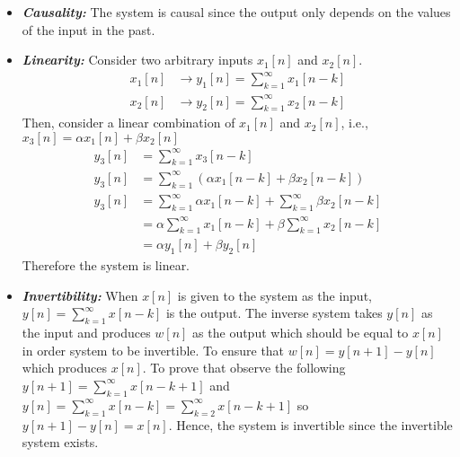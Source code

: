\documentclass[10pt,a4paper, margin=1in]{article}
\begin{document}
\begin{enumerate}
\begin{enumerate}
\begin{itemize}
		\item \textbf{\textit{Causality:}} The system is causal since the output only depends on the values of the input in the past.
		\item \textbf{\textit{Linearity:}} Consider two arbitrary inputs $x_1[n]$ and $x_2[n]$.
		\begin{equation}
		\begin{split}
			x_1[n] & \rightarrow y_1[n] = \sum_{k=1}^{\infty}x_1[n-k]\\
			x_2[n] & \rightarrow y_2[n] = \sum_{k=1}^{\infty}x_2[n-k]
		\end{split}
		\end{equation}
		Then, consider a linear combination of $x_1[n]$ and $x_2[n]$, i.e., $x_3[n]=\alpha x_1[n] + \beta x_2[n]$
		\begin{equation}
		\begin{split}
			y_3[n] & = \sum_{k=1}^{\infty}x_3[n-k]\\
			y_3[n] & = \sum_{k=1}^{\infty} \left( \alpha x_1[n - k] + \beta x_2[n - k] \right)\\
			y_3[n] & = \sum_{k=1}^{\infty} \alpha x_1[n - k] + \sum_{k=1}^{\infty} \beta x_2[n - k]\\
			& = \alpha \sum_{k=1}^{\infty}x_1[n-k] + \beta \sum_{k=1}^{\infty}x_2[n-k]\\
			& = \alpha y_1[n] + \beta y_2[n]
		\end{split}
		\end{equation}
		Therefore the system is linear.
		\item \textbf{\textit{Invertibility:}}  When $x[n]$ is given to the system as the input, $y[n] = \sum_{k=1}^{\infty} x[n-k]$ is the output. The inverse system takes $y[n]$ as the input and produces $w[n]$ as the output which should be equal to $x[n]$ in order system to be invertible. To ensure that $w[n]=y[n+1]-y[n]$ which produces $x[n]$. To prove that observe the following $y[n+1]= \sum_{k=1}^{\infty} x[n-k+1]$ and $y[n] = \sum_{k=1}^{\infty} x[n-k] = \sum_{k=2}^{\infty} x[n-k+1]$ so $y[n+1]-y[n]=x[n]$. Hence, the system is invertible since the invertible system exists.

\end{itemize}
\end{enumerate}
\end{enumerate}
\end{document}
